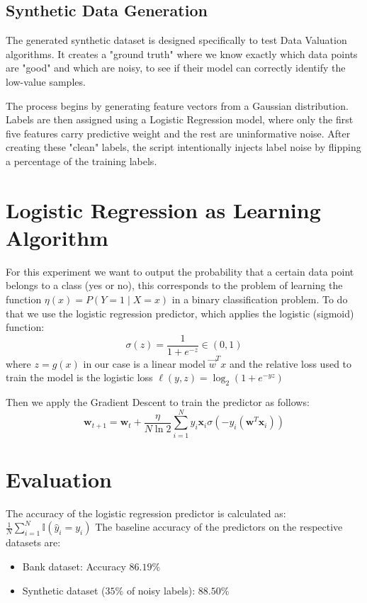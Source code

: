 \documentclass[pdflatex,sn-mathphys-num]{sn-jnl}
\begin{document}
\subsection{Synthetic Data Generation}

The generated synthetic dataset is designed specifically to test Data Valuation algorithms. It creates a "ground truth" where we know exactly which data points are "good" and which are noisy, to see if their model can correctly identify the low-value samples.

The process begins by generating feature vectors from a Gaussian distribution. Labels are then assigned using a Logistic Regression model, where only the first five features carry predictive weight and the rest are uninformative noise. After creating these "clean" labels, the script intentionally injects label noise by flipping a percentage of the training labels.

\section{Logistic Regression as Learning Algorithm}

For this experiment we want to output the probability that a certain data point belongs to a class (yes or no), this corresponds to the problem of learning the function $\eta(x) = P(Y = 1 \mid X = x)$ in a binary classification problem.
To do that we use the logistic regression predictor, which applies the logistic (sigmoid) function:
$$\sigma(z) = \frac{1}{1 + e^{-z}} \in (0, 1)$$
where $z = g(x)$ in our case is a linear model $\vec{w}^Tx$ and the relative loss used to train the model is the logistic loss $\ell(y, z) = \log_{2} (1 + e^{-y z})$


Then we apply the Gradient Descent to train the predictor as follows: 
$$\mathbf{w}_{t+1} = \mathbf{w}_t + \frac{\eta}{N \ln 2} \sum_{i=1}^{N} y_i \mathbf{x}_i \sigma(-y_i (\mathbf{w}^T\mathbf{x}_i))$$




\section{Evaluation}

The accuracy of the logistic regression predictor is calculated as: $\frac{1}{N} \sum_{i=1}^{N} \mathbb{I}(\hat{y}_i = y_i)$
The baseline accuracy of the predictors on the respective datasets are: 
\begin{itemize}
    \item Bank dataset: Accuracy $86.19\%$
    \item Synthetic dataset ($35\%$ of noisy labels): $88.50\%$
\end{itemize}
\end{document}
